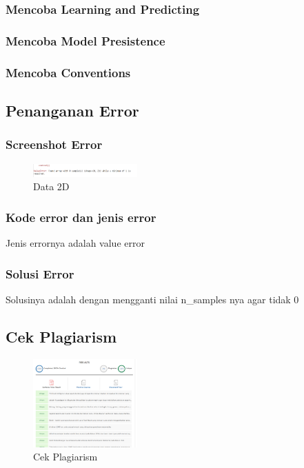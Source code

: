            \subsubsection{Mencoba Learning and Predicting}
            \hfill \break 

            \subsubsection{Mencoba Model Presistence}
            \hfill \break 

            \subsubsection{Mencoba Conventions}
            \hfill \break 
        \subsection{Penanganan Error}
            \subsubsection{Screenshot Error}
            \begin{figure}[H]
                \includegraphics[width=4cm]{figures/1174040/chap1/error.png}
                \centering
                \caption{Data 2D}
            \end{figure}
            \subsubsection{Kode error dan jenis error}
            Jenis errornya adalah value error
            \hfill \break 
            \subsubsection{Solusi Error}
            Solusinya adalah dengan mengganti nilai n\_samples nya agar tidak 0
    \subsection{Cek Plagiarism}
    \begin{figure}[H]
        \includegraphics[width=4cm]{figures/1174040/chap1/plagiat.png}
        \centering
        \caption{Cek Plagiarism}
    \end{figure}